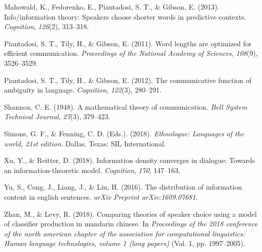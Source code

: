 \documentclass[10pt, letterpaper]{article}
\begin{document}
\hypertarget{ref-mahowald2013}{}
Mahowald, K., Fedorenko, E., Piantadosi, S. T., \& Gibson, E. (2013).
Info/information theory: Speakers choose shorter words in predictive
contexts. \emph{Cognition}, \emph{126}(2), 313--318.

\hypertarget{ref-piantadosi2011}{}
Piantadosi, S. T., Tily, H., \& Gibson, E. (2011). Word lengths are
optimized for efficient communication. \emph{Proceedings of the National
Academy of Sciences}, \emph{108}(9), 3526--3529.

\hypertarget{ref-piantadosi2012}{}
Piantadosi, S. T., Tily, H., \& Gibson, E. (2012). The communicative
function of ambiguity in language. \emph{Cognition}, \emph{122}(3),
280--291.

\hypertarget{ref-shannon1948}{}
Shannon, C. E. (1948). A mathematical theory of communication.
\emph{Bell System Technical Journal}, \emph{27}(3), 379--423.

\hypertarget{ref-simons2018}{}
Simons, G. F., \& Fenning, C. D. (Eds.). (2018). \emph{Ethnologue:
Languages of the world, 21st edition}. Dallas, Texas: SIL International.

\hypertarget{ref-xu2018}{}
Xu, Y., \& Reitter, D. (2018). Information density converges in
dialogue: Towards an information-theoretic model. \emph{Cognition},
\emph{170}, 147--163.

\hypertarget{ref-yu2016}{}
Yu, S., Cong, J., Liang, J., \& Liu, H. (2016). The distribution of
information content in english sentences. \emph{arXiv Preprint
arXiv:1609.07681}.

\hypertarget{ref-zhan2018}{}
Zhan, M., \& Levy, R. (2018). Comparing theories of speaker choice using
a model of classifier production in mandarin chinese. In
\emph{Proceedings of the 2018 conference of the north american chapter
of the association for computational linguistics: Human language
technologies, volume 1 (long papers)} (Vol. 1, pp. 1997--2005).


\end{document}
